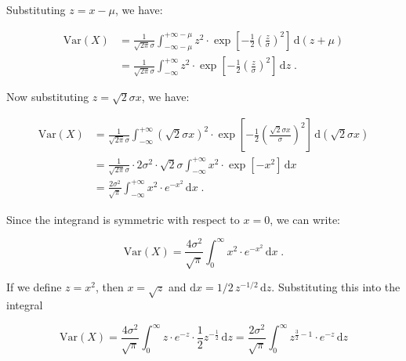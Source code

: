 \documentclass[a4paper,12pt,twoside]{book}
\begin{document}
Substituting $z = x -\mu$, we have:

\begin{equation} \label{eq:norm-var-norm-var-s2}
\begin{split}
\mathrm{Var}(X) &= \frac{1}{\sqrt{2 \pi} \sigma} \int_{-\infty-\mu}^{+\infty-\mu} z^2 \cdot \exp \left[ -\frac{1}{2} \left( \frac{z}{\sigma} \right)^2 \right] \, \mathrm{d}(z + \mu) \\
&= \frac{1}{\sqrt{2 \pi} \sigma} \int_{-\infty}^{+\infty} z^2 \cdot \exp \left[ -\frac{1}{2} \left( \frac{z}{\sigma} \right)^2 \right] \, \mathrm{d}z \; .
\end{split}
\end{equation}

Now substituting $z = \sqrt{2} \sigma x$, we have:

\begin{equation} \label{eq:norm-var-norm-var-s3}
\begin{split}
\mathrm{Var}(X) &= \frac{1}{\sqrt{2 \pi} \sigma} \int_{-\infty}^{+\infty} (\sqrt{2} \sigma x)^2 \cdot \exp \left[ -\frac{1}{2} \left( \frac{\sqrt{2} \sigma x}{\sigma} \right)^2 \right] \, \mathrm{d}(\sqrt{2} \sigma x) \\
&= \frac{1}{\sqrt{2 \pi} \sigma} \cdot 2 \sigma^2 \cdot \sqrt{2} \sigma \int_{-\infty}^{+\infty} x^2 \cdot \exp \left[ -x^2 \right] \, \mathrm{d}x \\
&= \frac{2 \sigma^2}{\sqrt{\pi}} \int_{-\infty}^{+\infty} x^2 \cdot e^{-x^2} \, \mathrm{d}x \; .
\end{split}
\end{equation}

Since the integrand is symmetric with respect to $x = 0$, we can write:

\begin{equation} \label{eq:norm-var-norm-var-s4}
\mathrm{Var}(X) = \frac{4 \sigma^2}{\sqrt{\pi}} \int_{0}^{\infty} x^2 \cdot e^{-x^2} \, \mathrm{d}x \; .
\end{equation}

If we define $z = x^2$, then $x = \sqrt{z}$ and $\mathrm{d}x = 1/2 \, z^{-1/2} \, \mathrm{d}z$. Substituting this into the integral

\begin{equation} \label{eq:norm-var-norm-var-s5}
\mathrm{Var}(X) = \frac{4 \sigma^2}{\sqrt{\pi}} \int_{0}^{\infty} z \cdot e^{-z} \cdot \frac{1}{2} z^{-\frac{1}{2}} \, \mathrm{d}z = \frac{2 \sigma^2}{\sqrt{\pi}} \int_{0}^{\infty} z^{\frac{3}{2}-1} \cdot e^{-z} \, \mathrm{d}z
\end{equation}
\end{document}
